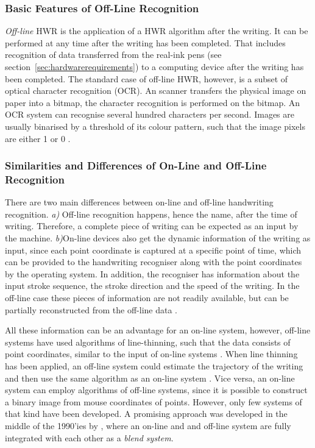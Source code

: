 \subsubsection{Basic Features of Off-Line Recognition}
\label{sec:basicfeaturesofofflinerecognition}

\emph{Off-line} HWR is the application of a HWR algorithm after the writing.
It can be performed at any time after the writing has been completed. That 
includes recognition of data transferred from the real-ink pens 
(see section~\ref{sec:hardwarerequirements}) to a computing device after the 
writing has been completed. The standard case of off-line HWR, however, is a 
subset of optical character recognition (OCR). An scanner transfers the physical 
image on paper into a bitmap, the character recognition is performed on the 
bitmap.
An OCR system can recognise several hundred characters per second. Images are
usually binarised by a threshold of its colour pattern, such that the image
pixels are either 1 or 0 .

\subsubsection{Similarities and Differences of On-Line and Off-Line  Recognition}
\label{sec:similaritiesanddifferences}

There are two main differences between on-line and off-line handwriting
recognition. \emph{a)} Off-line recognition happens, hence the name, 
after the time of writing. Therefore, a complete piece of writing can be 
expected as an input by the machine. \emph{b)}On-line devices also get the
dynamic information of the writing as input, since each point coordinate 
is captured at a specific point of time, which can be provided to the 
handwriting recogniser along with the point coordinates by the operating system.
In addition, the recogniser has information about the input stroke sequence, 
the stroke direction and the speed of the writing. In the off-line case these 
pieces of information are not readily available, but can be partially 
reconstructed from the off-line data .

All these information can be an advantage for an on-line system, however, 
off-line systems have used algorithms of line-thinning, such that the data 
consists of point coordinates, similar to the input of on-line systems 
. When line thinning has been applied, an off-line 
system could estimate the trajectory of the writing and then use the same 
algorithm as an on-line system . 
Vice versa, an on-line system can employ algorithms of off-line systems, 
since it is possible to construct a binary image from mouse coordinates 
of points. However, only few systems of that kind have been developed. 
A promising approach was developed in the middle of the 1990'ies by 
, where an on-line and and off-line system are 
fully integrated with each other as a \emph{blend system}.

